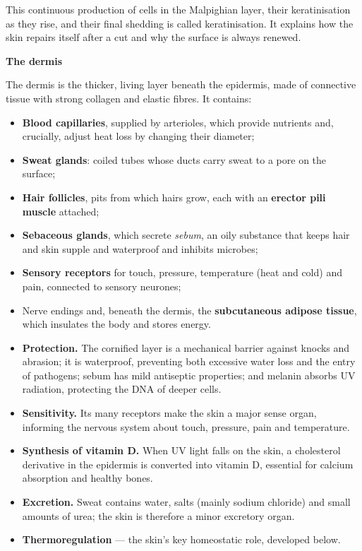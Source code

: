 \documentclass[11pt]{article}
\newcommand{\cle}[1]{{\popxbold\color{popdark}#1}}
\newcounter{popsec}
\newcounter{popsub}
\newcommand{\courssub}[1]{%
  \stepcounter{popsub}%
  \par\vspace{9pt}\noindent{\popxbold\fontsize{11.5}{13}\selectfont\color{popink}{\color{poporange}\thepopsec.\thepopsub}\hspace{6pt}#1}\par\nopagebreak\vspace{4pt}
}
\begin{document}
This continuous production of cells in the Malpighian layer, their keratinisation as they rise, and their final shedding is called \cle{keratinisation}. It explains how the skin repairs itself after a cut and why the surface is always renewed.

\textbf{The dermis}\par
The dermis is the thicker, living layer beneath the epidermis, made of connective tissue with strong collagen and elastic fibres. It contains:

\begin{itemize}
\item \textbf{Blood capillaries}, supplied by arterioles, which provide nutrients and, crucially, adjust heat loss by changing their diameter;
\item \textbf{Sweat glands}: coiled tubes whose ducts carry sweat to a pore on the surface;
\item \textbf{Hair follicles}, pits from which hairs grow, each with an \textbf{erector pili muscle} attached;
\item \textbf{Sebaceous glands}, which secrete \emph{sebum}, an oily substance that keeps hair and skin supple and waterproof and inhibits microbes;
\item \textbf{Sensory receptors} for touch, pressure, temperature (heat and cold) and pain, connected to sensory neurones;
\item Nerve endings and, beneath the dermis, the \textbf{subcutaneous adipose tissue}, which insulates the body and stores energy.
\end{itemize}

\courssub{Functions of the Skin}

\begin{itemize}
\item \textbf{Protection.} The cornified layer is a mechanical barrier against knocks and abrasion; it is waterproof, preventing both excessive water loss and the entry of pathogens; sebum has mild antiseptic properties; and melanin absorbs UV radiation, protecting the DNA of deeper cells.
\item \textbf{Sensitivity.} Its many receptors make the skin a major sense organ, informing the nervous system about touch, pressure, pain and temperature.
\item \textbf{Synthesis of vitamin D.} When UV light falls on the skin, a cholesterol derivative in the epidermis is converted into \cle{vitamin D}, essential for calcium absorption and healthy bones.
\item \textbf{Excretion.} Sweat contains water, salts (mainly sodium chloride) and small amounts of \cle{urea}; the skin is therefore a minor excretory organ.
\item \textbf{Thermoregulation} — the skin's key homeostatic role, developed below.
\end{itemize}
\end{document}
